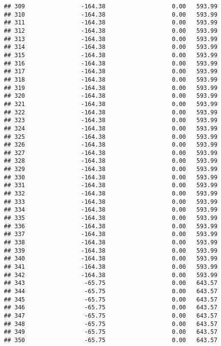 \documentclass[]{article}
\begin{document}
\begin{verbatim}
## 309                -164.38                   0.00   593.99
## 310                -164.38                   0.00   593.99
## 311                -164.38                   0.00   593.99
## 312                -164.38                   0.00   593.99
## 313                -164.38                   0.00   593.99
## 314                -164.38                   0.00   593.99
## 315                -164.38                   0.00   593.99
## 316                -164.38                   0.00   593.99
## 317                -164.38                   0.00   593.99
## 318                -164.38                   0.00   593.99
## 319                -164.38                   0.00   593.99
## 320                -164.38                   0.00   593.99
## 321                -164.38                   0.00   593.99
## 322                -164.38                   0.00   593.99
## 323                -164.38                   0.00   593.99
## 324                -164.38                   0.00   593.99
## 325                -164.38                   0.00   593.99
## 326                -164.38                   0.00   593.99
## 327                -164.38                   0.00   593.99
## 328                -164.38                   0.00   593.99
## 329                -164.38                   0.00   593.99
## 330                -164.38                   0.00   593.99
## 331                -164.38                   0.00   593.99
## 332                -164.38                   0.00   593.99
## 333                -164.38                   0.00   593.99
## 334                -164.38                   0.00   593.99
## 335                -164.38                   0.00   593.99
## 336                -164.38                   0.00   593.99
## 337                -164.38                   0.00   593.99
## 338                -164.38                   0.00   593.99
## 339                -164.38                   0.00   593.99
## 340                -164.38                   0.00   593.99
## 341                -164.38                   0.00   593.99
## 342                -164.38                   0.00   593.99
## 343                 -65.75                   0.00   643.57
## 344                 -65.75                   0.00   643.57
## 345                 -65.75                   0.00   643.57
## 346                 -65.75                   0.00   643.57
## 347                 -65.75                   0.00   643.57
## 348                 -65.75                   0.00   643.57
## 349                 -65.75                   0.00   643.57
## 350                 -65.75                   0.00   643.57

\end{verbatim}
\end{document}

